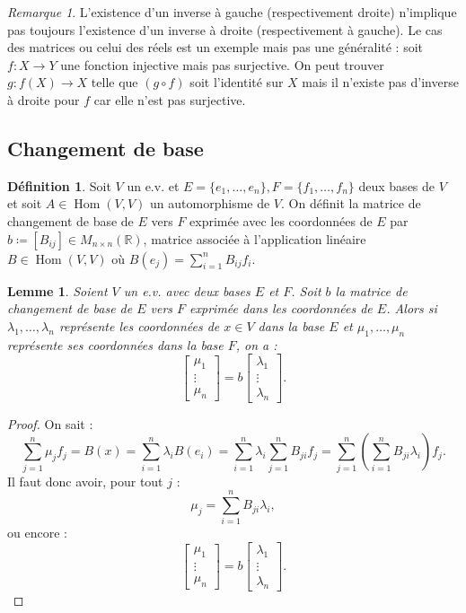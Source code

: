 \documentclass{article}
\DeclareMathOperator{\Hom}{Hom}
\newcommand{\R}{\mathbb R}
\newcommand{\M}[3]{M_{#1 \times #2}(#3)}
\newtheorem{lem}[thm]{Lemme}
\theoremstyle{definition}
\newtheorem{déf}[thm]{Définition}
\theoremstyle{remark}
\newtheorem*{rmq}{Remarque}
\begin{document}
		\begin{rmq} L'existence d'un inverse à gauche (respectivement droite) n'implique pas toujours l'existence d'un inverse à droite (respectivement à gauche). Le cas des
		matrices ou celui des réels est un exemple mais pas une généralité : soit $f : X \to Y$ une fonction injective mais pas surjective. On peut trouver $g : f(X) \to X$
		telle que $(g \circ f)$ soit l'identité sur $X$ mais il n'existe pas d'inverse à droite pour $f$ car elle n'est pas surjective. \end{rmq}

	\subsection{Changement de base}
		\begin{déf} Soit $V$ un e.v. et $E = \{e_1, \ldots, e_n\}, F = \{f_1, \ldots, f_n\}$ deux bases de $V$ et soit $A \in \Hom(V, V)$ un automorphisme de $V$.
		On définit la matrice de changement de base de $E$ vers $F$ exprimée avec les coordonnées de $E$ par $b \coloneqq [B_{ij}] \in \M nn\R$, matrice associée à
		l'application linéaire $B \in \Hom(V, V)$ où $B(e_j) = \sum_{i=1}^nB_{ij}f_i$. \end{déf}

		\begin{lem} Soient $V$ un e.v. avec deux bases $E$ et $F$. Soit $b$ la matrice de changement de base de $E$ vers $F$ exprimée dans les coordonnées de $E$.
		Alors si $\lambda_1, \ldots, \lambda_n$ représente les coordonnées de $x \in V$ dans la base $E$ et $\mu_1, \ldots, \mu_n$ représente ses coordonnées dans la base $F$,
		on a : \[\begin{bmatrix}\mu_1 \\\vdots \\ \mu_n\end{bmatrix} = b\begin{bmatrix}\lambda_1 \\ \vdots \\ \lambda_n\end{bmatrix}.\]\end{lem}

		\begin{proof} On sait : \[\sum_{j=1}^n\mu_jf_j = B(x) = \sum_{i=1}^n\lambda_iB(e_i) = \sum_{i=1}^n\lambda_i\sum_{j=1}^nB_{ji}f_j
		= \sum_{j=1}^n\left(\sum_{i=1}^nB_{ji}\lambda_i\right)f_j.\] Il faut donc avoir, pour tout $j$ : \[\mu_j = \sum_{i=1}^nB_{ji}\lambda_i,\] ou encore :
		\[\begin{bmatrix}\mu_1 \\ \vdots \\ \mu_n\end{bmatrix} = b\begin{bmatrix}\lambda_1 \\ \vdots \\ \lambda_n\end{bmatrix}.\] \end{proof}
\end{document}
